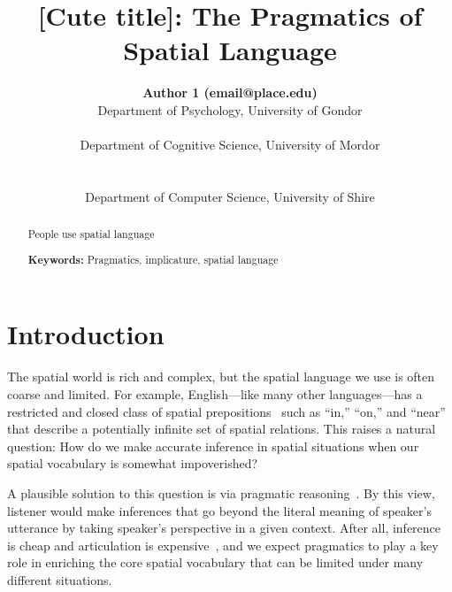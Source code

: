 \documentclass[10pt,letterpaper]{article}
\title{[Cute title]: The Pragmatics of Spatial Language}
\author{
{\large \bf Author 1 (email@place.edu)} \\
  Department of Psychology, University of Gondor\\
  \And{\large \bf Author 2 (email@place.edu)} \\
  Department of Cognitive Science, University of Mordor \\
  \\
 \AND{\large \bf Author 3 (email@people.edu)} \\
  Department of Computer Science, University of Shire\\
}
\begin{document}
\maketitle

\begin{abstract}
People use spatial language

\textbf{Keywords:} 
Pragmatics, implicature, spatial language
\end{abstract}

\section{Introduction}

The spatial world is rich and complex, but the spatial language we use is often coarse and limited. For example, English---like many other languages---has a restricted and closed class of spatial prepositions~\cite{talmy83,talmy00,landau93} such as ``in,'' ``on,'' and ``near'' that describe a potentially infinite set of spatial relations. This raises a natural question: How do we make accurate inference in spatial situations when our spatial vocabulary is somewhat impoverished?

A plausible solution to this question is via pragmatic reasoning~\cite{}. By this view, listener would make inferences that go beyond the literal meaning of speaker's utterance by taking speaker's perspective in a given context. After all, inference is cheap and articulation is expensive~\cite{levinson00}, and we expect pragmatics to play a key role in enriching the core spatial vocabulary that can be limited under many different situations. 
\end{document}
